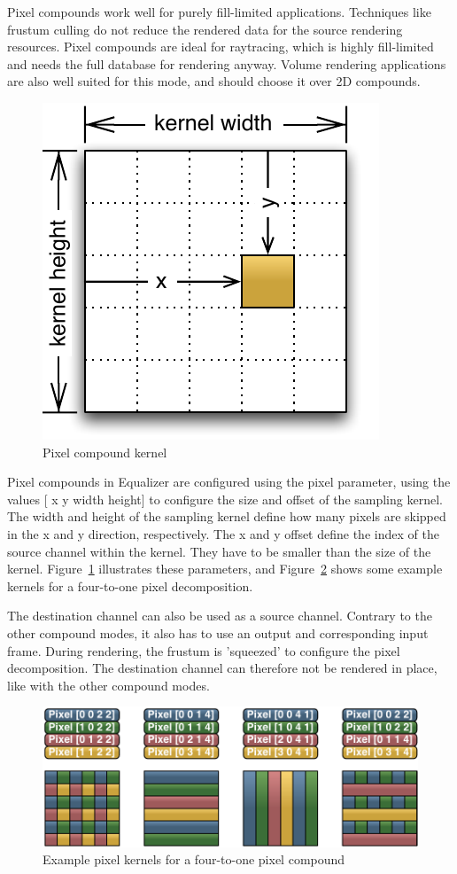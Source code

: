 \documentclass[10pt,a4]{scrartcl}
\newcommand{\fig}[1]{Figure~\ref{#1}}
\begin{document}
Pixel compounds work well for purely fill-limited applications.
Techniques like frustum culling do not reduce the rendered data for the
source rendering resources. Pixel compounds are ideal for raytracing,
which is highly fill-limited and needs the full database for rendering
anyway. Volume rendering applications are also well suited for this
mode, and should choose it over 2D compounds.

\begin{figure}
  \includegraphics[width=.382\textwidth]{images/pixelKernel.pdf}
  {\caption{\label{fPixelKernel}\small Pixel compound kernel}}
\end{figure}
Pixel compounds in Equalizer are configured using the \textsf{pixel}
parameter, using the values \textsf{[ x y width height]}  to configure
the size and offset of the sampling kernel. The width and height of the
sampling kernel define how many pixels are skipped in the x and y
direction, respectively. The x and y offset define the index of the
source channel within the kernel. They have to be smaller than the size
of the kernel. \fig{fPixelKernel} illustrates these parameters, and
\fig{fPixelKernels} shows some example kernels for a four-to-one pixel decomposition.

The destination channel can also be used as a source channel. Contrary
to the other compound modes, it also has to use an output and
corresponding input frame. During rendering, the frustum is 'squeezed'
to configure the pixel decomposition. The destination channel can
therefore not be rendered in place, like with the other compound modes.
\begin{figure}[ht!]\center
  \includegraphics[width=.9\textwidth]{images/pixelKernels.pdf}
  {\caption{\small\label{fPixelKernels}Example pixel kernels for a
      four-to-one pixel compound}}
\end{figure}
\end{document}
